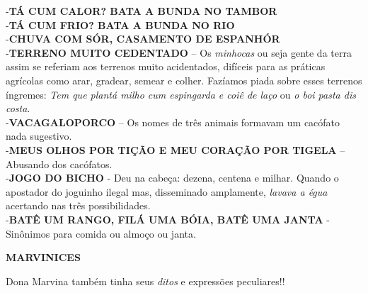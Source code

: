 \documentclass[12pt,brazil,]{book}
\begin{document}
\begin{itemize}
  -\textbf{TÁ CUM CALOR? BATA A BUNDA NO TAMBOR}\\
  -\textbf{TÁ CUM FRIO? BATA A BUNDA NO RIO}\\
  -\textbf{CHUVA COM SÓR, CASAMENTO DE ESPANHÓR}\\
  -\textbf{TERRENO MUITO CEDENTADO} -- Os \emph{minhocas} ou seja gente
  da terra assim se referiam aos terrenos muito acidentados, difíceis
  para as práticas agrícolas como arar, gradear, semear e colher.
  Fazíamos piada sobre esses terrenos íngremes: \emph{Tem que plantá
  milho cum espingarda e coiê de laço} ou \emph{o boi pasta dis
  costa}.\\
  -\textbf{VACAGALOPORCO} -- Os nomes de três animais formavam um
  cacófato nada sugestivo.\\
  -\textbf{MEUS OLHOS POR TIÇÃO E MEU CORAÇÃO POR TIGELA} -- Abusando
  dos cacófatos.\\
  -\textbf{JOGO DO BICHO} - Deu na cabeça: dezena, centena e milhar.
  Quando o apostador do joguinho ilegal mas, disseminado amplamente,
  \emph{lavava a égua} acertando nas três possibilidades.\\
  -\textbf{BATÊ UM RANGO, FILÁ UMA BÓIA, BATÊ UMA JANTA} - Sinônimos
  para comida ou almoço ou janta.
\end{itemize}

\textbf{MARVINICES}

Dona Marvina também tinha seus \emph{ditos} e expressões peculiares!!
\end{document}
